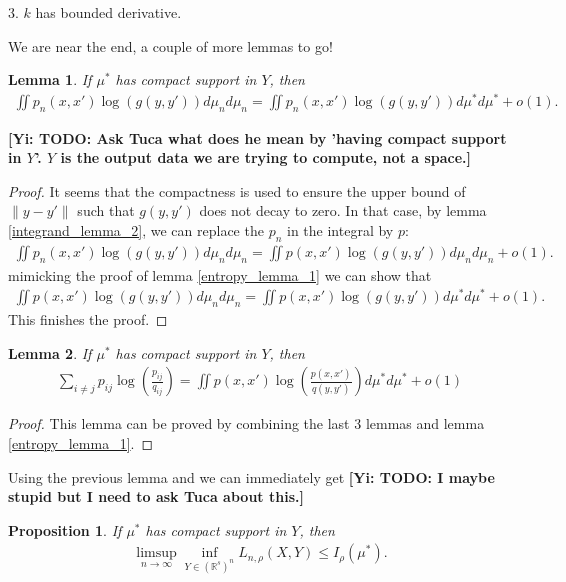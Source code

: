 \documentclass[10pt]{article}
\newcommand{\norm}[1]{\left\lVert#1\right\rVert}
\newcommand{\gy}[1]{\textbf{\color{gred}[Yi: #1]}}
\newtheorem{lemma}{\bf Lemma}
\newtheorem{proposition}{\bf Proposition}
\newenvironment{Proof of lemma}{\noindent{\bf Proof of Lemma}}{\hfill$\Box$\newline}
\newenvironment{Proof of claim}{\noindent{\bf Proof of claim}}{\hfill$\Box$\newline}
\newenvironment{Proof of theorem}{\noindent{\bf Proof of Theorem}}{\hfill\scriptsize{$\Box$}\newline}
\newenvironment{Proof of theorems}{\noindent{\bf Proof of Theorems}}{\hfill$\Box$\newline}
\newenvironment{Proof of proposition}{\noindent{\bf Proof of Proposition}}{\hfill$\Box$\newline}
\newenvironment{Proof of propositions}{\noindent{\bf Proof of Propositions}}{\hfill$\Box$\newline}
\newenvironment{Proof of exercise}{\noindent{\it Proof of Exercise:}}{\hfill$\Box$}
\numberwithin{equation}{section}
\begin{document}
3. $k$ has bounded derivative.

We are near the end, a couple of more lemmas to go!
\begin{lemma}
    If $\mu^*$ has compact support in $Y$, then
    \begin{align}
        \iint p_n(x,x') \log(g(y,y')) d\mu_n d\mu_n = \iint p_n(x,x') \log(g(y,y')) d\mu^* d\mu^* +o(1).
    \end{align}
\end{lemma}
\gy{TODO: Ask Tuca what does he mean by 'having compact support in $Y$'. $Y$ is the output data we are trying to compute, not a space.}
\begin{proof}
    It seems that the compactness is used to ensure the upper bound of $\norm{y-y'}$ such that $g(y,y')$ does not decay to zero. In that case, by lemma \ref{integrand_lemma_2}, we can replace the $p_n$ in the integral by $p$:
    \begin{align}
        \iint p_n(x,x') \log(g(y,y')) d\mu_n d\mu_n = \iint p(x,x') \log(g(y,y')) d\mu_n d\mu_n + o(1).
    \end{align}
    mimicking the proof of lemma \ref{entropy_lemma_1} we can show that
    \begin{align}
        \iint p(x,x') \log(g(y,y')) d\mu_n d\mu_n = \iint p(x,x') \log(g(y,y')) d\mu^* d\mu^* + o(1).
    \end{align}
    This finishes the proof.
\end{proof}
\begin{lemma}
    If $\mu^*$ has compact support in $Y$, then
    \begin{align}
        \sum_{i \neq j} p_{ij} \log \left(\frac{p_{ij}}{q_{ij}}\right) = \iint p(x,x') \log\left(\frac{p(x,x')}{q(y,y')}\right) d\mu^* d\mu^* +o(1)
    \end{align}
\end{lemma}
\begin{proof}
    This lemma can be proved by combining the last 3 lemmas and lemma \ref{entropy_lemma_1}.
\end{proof}
Using the previous lemma and we can immediately get \gy{TODO: I maybe stupid but I need to ask Tuca about this.}
\begin{proposition} \label{upper_bound_prop}
    If $\mu^*$ has compact support in $Y$, then
    \begin{align}
        \limsup_{n \to \infty} \inf_{Y \in (\mathbb{R}^s)^n} L_{n,\rho}(X,Y) \leq I_{\rho}(\mu^*).
    \end{align}
\end{proposition}
\end{document}
